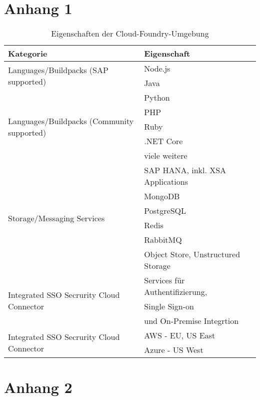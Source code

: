 \newpage
\appendix

\section{Anhang 1}

\begin{table}[h]
  \begin{tabular}{lll}
    \toprule
    Kategorie & Eigenschaft\\
    \midrule
    \multirow[t]{2}{*}{Languages/Buildpacks (SAP supported)} & Node.js  \\
     & Java \\
     \multirow[t]{5}{*}{Languages/Buildpacks (Community supported)} & Python \\
     & PHP \\
     & Ruby \\
     & .NET Core \\
     & viele weitere \\
     \multirow[t]{6}{*}{Storage/Messaging Services} & SAP HANA, inkl. XSA Applications \\
     & MongoDB \\
     & PostgreSQL \\
     & Redis \\
     & RabbitMQ \\
     & Object Store, Unstructured Storage \\
     \multirow[t]{3}{*}{Integrated SSO Secrurity Cloud Connector} & Services für Authentifizierung,\\
     & Single Sign-on \\
     & und On-Premise Integrtion \\
     \multirow[t]{3}{*}{Integrated SSO Secrurity Cloud Connector} & AWS - EU, US East\\
     & Azure - US West  \\
    \bottomrule
    \end{tabular}
    \label{cf_table}
  \caption[Eigenschaften der Cloud-Foundry-Umgebung]{Eigenschaften der Cloud-Foundry-Umgebung \citep[S. 195]{Utecht2018}}
\end{table}

\section{Anhang 2}

\newpage
